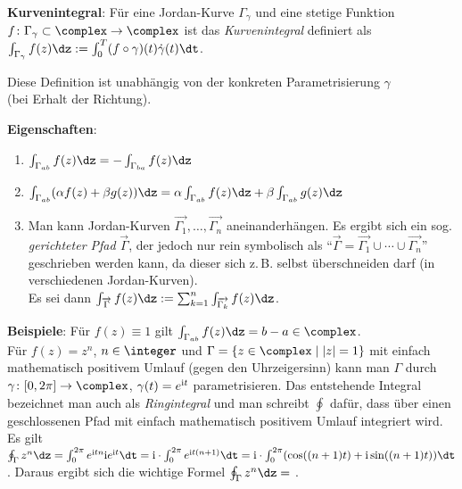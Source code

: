 \textbf{Kurvenintegral}:
Für eine Jordan-Kurve $\Gamma_\gamma$ und eine stetige Funktion
$f\colon \Gamma_\gamma \subset \complex \rightarrow \complex$ ist das
\emph{Kurvenintegral} definiert als $\int_{\Gamma_\gamma} f(z)\dz
:= \int_0^T (f \circ \gamma)(t) \dot{\gamma}(t) \dt$.

Diese Definition ist unabhängig von der konkreten Parametrisierung $\gamma$\\
(bei Erhalt der Richtung).

\linie

\textbf{Eigenschaften}:
\begin{enumerate}
    \item
    $\int_{\Gamma_{ab}} f(z)\dz = -\int_{\Gamma_{ba}} f(z)\dz$
    
    \item
    $\int_{\Gamma_{ab}} (\alpha f(z) + \beta g(z))\dz =
    \alpha \int_{\Gamma_{ab}} f(z)\dz + \beta \int_{\Gamma_{ab}} g(z)\dz$
    
    \item
    Man kann Jordan-Kurven
    $\overrightarrow{\Gamma_1}, \dotsc, \overrightarrow{\Gamma_n}$
    aneinanderhängen.
    Es ergibt sich ein sog. \emph{gerichteter Pfad} $\overrightarrow{\Gamma}$,
    der jedoch nur rein symbolisch als
    "`$\overrightarrow{\Gamma} =
    \overrightarrow{\Gamma_1} \cup \dotsb \cup \overrightarrow{\Gamma_n}$"'
    geschrieben werden kann, da dieser sich z.\,B. selbst überschneiden darf
    (in verschiedenen Jordan-Kurven).\\
    Es sei dann $\int_{\overrightarrow{\Gamma}} f(z)\dz :=
    \sum_{k=1}^n \int_{\overrightarrow{\Gamma_k}} f(z)\dz$.
\end{enumerate}

\textbf{Beispiele}:
Für $f(z) \equiv 1$ gilt $\int_{\Gamma_{ab}} f(z)\dz = b - a \in \complex$.\\
Für $f(z) = z^n$, $n \in \integer$ und
$\Gamma = \{z \in \complex \;|\; |z| = 1\}$ mit einfach mathematisch positivem
Umlauf (gegen den Uhrzeigersinn) kann man $\Gamma$ durch
$\gamma\colon [0, 2\pi] \rightarrow \complex$, $\gamma(t) = e^{\mathrm{i} t}$
parametrisieren.
Das entstehende Integral bezeichnet man auch als \emph{Ringintegral}
und man schreibt $\oint$ dafür, dass über einen geschlossenen Pfad
mit einfach mathematisch positivem Umlauf integriert wird.\\
Es gilt $\oint_\Gamma z^n \dz = \int_0^{2\pi} e^{\i tn} \i e^{\i t} \dt
= \i \cdot \int_0^{2\pi} e^{\i t(n+1)} \dt
= \i \cdot \int_0^{2\pi} (\cos((n+1)t) + \i \sin((n+1)t)) \dt$.
Daraus ergibt sich die wichtige Formel
$\oint_\Gamma z^n \dz =$
.

